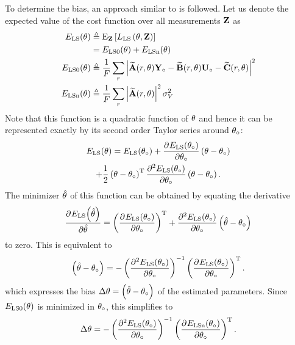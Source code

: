 To determine the bias, an approach similar to \citep[Appendix A]{Guillaume1995} is followed.
Let us denote the expected value of the cost function over all measurements $\LocalVector{Z}$ as
\begin{align}
  \ELSCost{\theta}
              & \isdef 
                   \E[\LocalVector{Z}]%
                         {    
                                \LSCost{\LocalVector{\theta}, \LocalVector{Z}}} \\
              & = \ELSCost[0]{\theta} + \ELSCost[n]{\theta} \\
    \ELSCost[0]{\theta} & \isdef 
            \frac{1}{F} 
                \sum_{r} 
                     \left| 
                             \LocalModel{A}(r, \LocalVector{\theta}) \true{\LocalVector{Y}}
                          - \LocalModel{B}(r, \LocalVector{\theta}) \true{\LocalVector{U}}
                          - \LocalModel{C}(r, \LocalVector{\theta}) 
                    \right|^2 \\
    \ELSCost[n]{\theta} & \isdef 
              \frac{1}{F} 
                     \sum_{r} 
                              \left| \LocalModel{A}(r,\LocalVector{\theta}) \right|^2 
                              \sigma_V^2
\end{align}
Note that this function is a quadratic function of $\LocalVector{\theta}$ and hence it can be represented exactly by its second order Taylor series around $\true\theta$:
\begin{multline}
  \ELSCost{\theta} = \ELSCost{\true\theta} 
  + \PartialDerivative{\ELSCost{\true\theta}}{\true\theta}  \left( \theta - \true\theta \right)\\
  + \frac{1}{2} \left( \theta - \true\theta \right)^{\T} 
  \PartialDerivative[2]{\ELSCost{\true\theta}}{\true\theta} 
   \left( \theta - \true\theta \right)
   \text{.}
\end{multline}
The minimizer $\estim\theta$ of this function can be obtained by equating the derivative
\begin{equation}
  \PartialDerivative{\ELSCost{\estim\theta}}{\estim\theta} = \left( \PartialDerivative{\ELSCost{\true\theta}}{\true\theta} \right)^{\T} + \PartialDerivative[2]{\ELSCost{\true\theta}}{\true\theta} 
   \left( \estim\theta - \true\theta \right)
\end{equation}
to zero.
This is equivalent to 
\begin{equation}
  \left( \estim\theta - \true\theta \right) = - \left(   \PartialDerivative[2]{\ELSCost{\true\theta}}{\true\theta} \right)^{-1}  \left( \PartialDerivative{\ELSCost{\true\theta}}{\true\theta} \right)^{\T}
  \text{.}
\end{equation}
which expresses the bias $\Delta\theta = \left( \estim\theta - \true\theta \right)$ of the estimated parameters.
Since $\ELSCost[0]{\theta}$ is minimized in $\true\theta$, this simplifies to
\begin{equation}
  \Delta\theta = - \left(   \PartialDerivative[2]{\ELSCost{\true\theta}}{\true\theta} \right)^{-1}  \left( \PartialDerivative{\ELSCost[n]{\true\theta}}{\true\theta} \right)^{\T}
  \text{.}
\end{equation}

